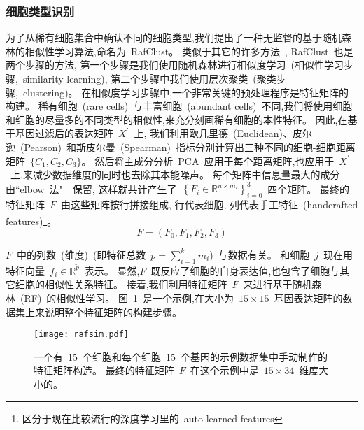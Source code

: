 \subsubsection{细胞类型识别}
\label{subsec:rafclust} 
为了从稀有细胞集合中确认不同的细胞类型,我们提出了一种无监督的基于随机森林的相似性学习算法,命名为~RafClust。
类似于其它的许多方法~\cite{kiselev2017sc3,pouyan2018random,mohammadi2018geometric,sinha2018dropclust,Srinivasan511626,Li530378,zheng2019sinnlrr},
RafClust~也是两个步骤的方法,
第一个步骤是我们使用随机森林进行相似度学习~(相似性学习步骤,~similarity learning),
第二个步骤中我们使用层次聚类~(聚类步骤,~clustering)。
在相似度学习步骤中,一个非常关键的预处理程序是特征矩阵的构建。
稀有细胞~(rare cells)~与丰富细胞~(abundant cells)~不同,我们将使用细胞和细胞的尽量多的不同类型的相似性,来充分刻画稀有细胞的本性特征。
因此,在基于基因过滤后的表达矩阵~$X^{\prime}$~上,
我们利用欧几里德~(Euclidean)、皮尔逊~(Pearson)~和斯皮尔曼~(Spearman)~指标分别计算出三种不同的细胞-细胞距离矩阵~$\{C_1, C_2, C_3\}$。
然后将主成分分析~PCA~应用于每个距离矩阵,也应用于~$X^{\prime}$~上,来减少数据维度的同时也去除其本能噪声。
每个矩阵中信息量最大的成分由``elbow~法"~\cite{thorndike1953belongs}~保留,
这样就共计产生了~$\left\{ {F}_{i} \in \mathbb {R} ^ {n \times m_{i}} \right\}_{i = 0}^{3}$~四个矩阵。
最终的特征矩阵~$F$~由这些矩阵按行拼接组成, 行代表细胞, 列代表手工特征~(handcrafted features)\footnote{区分于现在比较流行的深度学习里的~auto-learned features}。
\begin{equation}
\label{lab:f}
{F} = ({F}_{0}, {F}_{1}, {F}_{2}, {F}_{3})
\end{equation}

$F$~中的列数~(维度)~(即特征总数~$\tilde {p} = \sum_{i = 1}^{k} m_{i}$)~与数据有关。
和细胞~$j$~现在用特征向量~$f_{i} \in \mathbb {R} ^ {\tilde{p}}$~表示。
显然,$F$~既反应了细胞的自身表达值,也包含了细胞与其它细胞的相似性关系特征。
接着,我们利用特征矩阵~$F$~来进行基于随机森林~(RF)~的相似性学习。
图~\ref{fig:rafsim}~是一个示例,在大小为~$15 \times 15$~基因表达矩阵的数据集上来说明整个特征矩阵的构建步骤。

\begin{figure}[!htbp]
    \centering
    \texttt{[image: rafsim.pdf]}
    \caption{
        一个有~15~个细胞和每个细胞~15~个基因的示例数据集中手动制作的特征矩阵构造。
        最终的特征矩阵~$F$~在这个示例中是~$15\times34$~维度大小的。
    }
    \label{fig:rafsim}
\end{figure}

